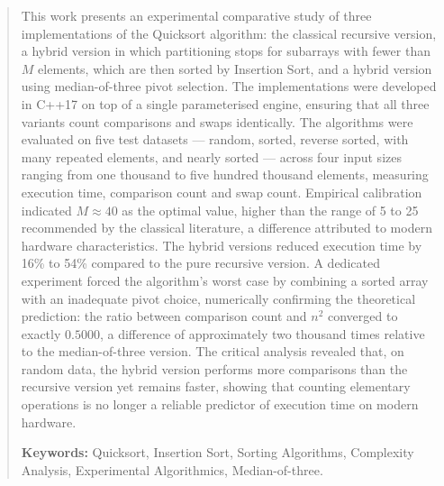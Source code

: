 \begin{abstract}
\vspace{-1cm}
\onehalfspacing

\noindent This work presents an experimental comparative study of three
implementations of the Quicksort algorithm: the classical recursive version, a hybrid
version in which partitioning stops for subarrays with fewer than $M$ elements, which
are then sorted by Insertion Sort, and a hybrid version using median-of-three pivot
selection. The implementations were developed in C++17 on top of a single
parameterised engine, ensuring that all three variants count comparisons and swaps
identically. The algorithms were evaluated on five test datasets --- random, sorted,
reverse sorted, with many repeated elements, and nearly sorted --- across four input
sizes ranging from one thousand to five hundred thousand elements, measuring
execution time, comparison count and swap count. Empirical calibration indicated
$M \approx 40$ as the optimal value, higher than the range of 5 to 25 recommended by
the classical literature, a difference attributed to modern hardware characteristics.
The hybrid versions reduced execution time by 16\% to 54\% compared to the pure
recursive version. A dedicated experiment forced the algorithm's worst case by
combining a sorted array with an inadequate pivot choice, numerically confirming the
theoretical prediction: the ratio between comparison count and $n^2$ converged to
exactly $0.5000$, a difference of approximately two thousand times relative to the
median-of-three version. The critical analysis revealed that, on random data, the
hybrid version performs more comparisons than the recursive version yet remains
faster, showing that counting elementary operations is no longer a reliable predictor
of execution time on modern hardware.

\vspace*{.75cm}

\noindent \textbf{Keywords:} Quicksort, Insertion Sort, Sorting Algorithms,
Complexity Analysis, Experimental Algorithmics, Median-of-three.

\end{abstract}
